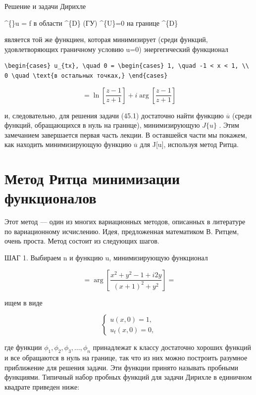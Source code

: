 \documentclass[
  ukrainian,
]{article}
\begin{document}
Решение и задачи Дирихле

\^{}\{\Lambda\}u = f в области \^{}\{D\} (ГУ) \^{}\{U\}=0 на границе
\^{}\{D\}

является той же функциен, которая минимизирует (среди функций,
удовлетворяющих граничному условию u=0) энергегический функционал

\begin{verbatim}
\begin{cases} u_{tx}, \quad 0 = \begin{cases} 1, \quad -1 < x < 1, \\ 0 \quad \text{в остальных точках,} \end{cases}
\end{verbatim}

\[
= \ln\left[\frac{z-1}{z+1}\right] + i \arg\left[\frac{z-1}{z+1}\right]
\]

и, следовательно, для решения задачи (45.1) достаточно найти функцию
\(\overline{u}\) (среди функций, обращающихся в нуль на граннце),
минимизирующую \(J\{u\}\) . Этим замечанием завершается первая часть
лекции. В оставшейся части мы покажем, как находить минимизирующую
функцию \(\overline{u}\) для J{[}u{]}, используя метод Ритца.

\section{Метод Ритца минимизации
функционалов}\label{ux43cux435ux442ux43eux434-ux440ux438ux442ux446ux430-ux43cux438ux43dux438ux43cux438ux437ux430ux446ux438ux438-ux444ux443ux43dux43aux446ux438ux43eux43dux430ux43bux43eux432}

Этот метод --- один из многих вариационных методов, описанных в
литературе по вариационному исчислению. Идея, предложенная математиком
В. Ритцем, очень проста. Метод состоит из следующих шагов.

ШАГ 1. Выбираем n и функцию u, минимизирующую функционал

\[
= \arg\left[\frac{x^2+y^2-1+i2y}{(x+1)^2+y^2}\right] =
\]

ищем в виде

\[
\begin{cases} u(x, 0) = 1, \\ u_t(x, 0) = 0, \end{cases}
\]

где функции \(\phi_1, \phi_2, \phi_3, \ldots, \phi_n\) принадлежат к
классу достаточно хороших функций и все обращаются в нуль на границе,
так что из них можно построить разумное приближение для решения задачи.
Эти функции принято называть пробными функциями. Типичный набор пробных
функций для задачи Дирихле в единичном квадрате приведен ниже:
\end{document}
